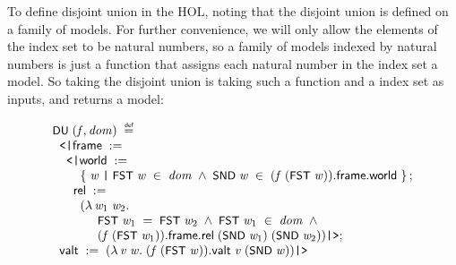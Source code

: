 \documentclass{report}
\renewcommand{\HOLConst}[1]{{\textsf{\upshape\small #1}}}
\newenvironment{holmath}{\begin{displaymath}\begin{array}{l}}{\end{array}\end{displaymath}\ignorespacesafterend}
\begin{document}
To define disjoint union in the HOL, noting that the disjoint union is defined on a family of models. For further convenience, we will only allow the elements of the index set to be natural numbers, so a family of models indexed by natural numbers is just a function that assigns each natural number in the index set a model. So taking the disjoint union is taking such a function and a index set as inputs, and returns a model:

\begin{holmath}
  \HOLConst{DU}\;(\HOLFreeVar{f}\HOLSymConst{,}\HOLFreeVar{dom})\;\HOLSymConst{\HOLTokenDefEquality{}}\\
\;\;\HOLTokenLeftrec{}\HOLFieldName{frame}\;:=\\
\;\;\;\;\HOLTokenLeftrec{}\HOLFieldName{world}\;:=\\
\;\;\;\;\;\;\;\;\HOLTokenLeftbrace{}\HOLBoundVar{w}\;\HOLTokenBar{}\;\HOLConst{FST}\;\HOLBoundVar{w}\;\HOLSymConst{\HOLTokenIn{}}\;\HOLFreeVar{dom}\;\HOLSymConst{\HOLTokenConj{}}\;\HOLConst{SND}\;\HOLBoundVar{w}\;\HOLSymConst{\HOLTokenIn{}}\;(\HOLFreeVar{f}\;(\HOLConst{FST}\;\HOLBoundVar{w})).\HOLFieldName{frame}.\HOLFieldName{world}\HOLTokenRightbrace{};\\
\;\;\;\;\;\;\HOLFieldName{rel}\;:=\\
\;\;\;\;\;\;\;\;(\HOLTokenLambda{}\HOLBoundVar{w\sb{\mathrm{1}}}\;\HOLBoundVar{w\sb{\mathrm{2}}}.\\
\;\;\;\;\;\;\;\;\;\;\;\;\;\HOLConst{FST}\;\HOLBoundVar{w\sb{\mathrm{1}}}\;\HOLSymConst{=}\;\HOLConst{FST}\;\HOLBoundVar{w\sb{\mathrm{2}}}\;\HOLSymConst{\HOLTokenConj{}}\;\HOLConst{FST}\;\HOLBoundVar{w\sb{\mathrm{1}}}\;\HOLSymConst{\HOLTokenIn{}}\;\HOLFreeVar{dom}\;\HOLSymConst{\HOLTokenConj{}}\\
\;\;\;\;\;\;\;\;\;\;\;\;\;(\HOLFreeVar{f}\;(\HOLConst{FST}\;\HOLBoundVar{w\sb{\mathrm{1}}})).\HOLFieldName{frame}.\HOLFieldName{rel}\;(\HOLConst{SND}\;\HOLBoundVar{w\sb{\mathrm{1}}})\;(\HOLConst{SND}\;\HOLBoundVar{w\sb{\mathrm{2}}}))\HOLTokenRightrec{};\\
\;\;\HOLFieldName{valt}\;:=\;(\HOLTokenLambda{}\HOLBoundVar{v}\;\HOLBoundVar{w}.\;(\HOLFreeVar{f}\;(\HOLConst{FST}\;\HOLBoundVar{w})).\HOLFieldName{valt}\;\HOLBoundVar{v}\;(\HOLConst{SND}\;\HOLBoundVar{w}))\HOLTokenRightrec{}
\end{holmath}
\end{document}
